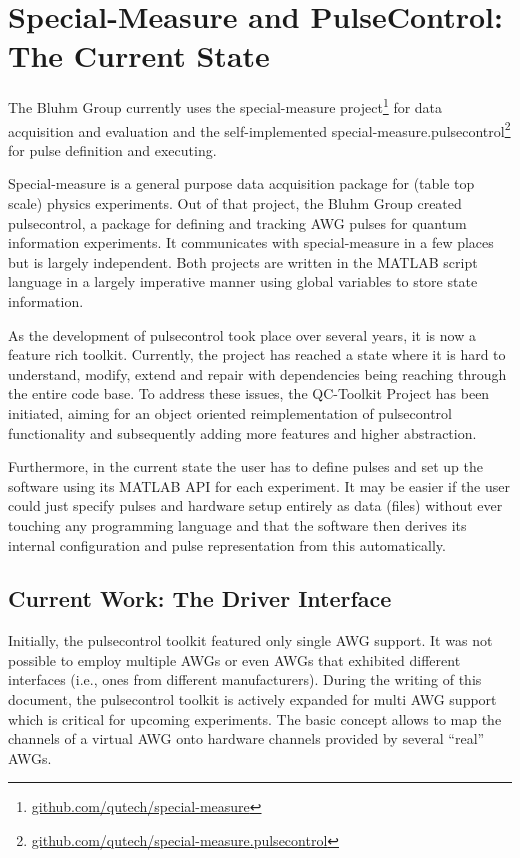 \documentclass[a4paper,12pt]{article}
\begin{document}
\section{Special-Measure and PulseControl: The Current State}
\label{sec:CurrentState}
The Bluhm Group currently uses the special-measure project\footnote{\href{https://github.com/qutech/special-measure}{github.com/qutech/special-measure}} for data acquisition and evaluation and the self-implemented special-measure.pulsecontrol\footnote{\href{https://github.com/qutech/special-measure.pulsecontrol}{github.com/qutech/special-measure.pulsecontrol}} for pulse definition and executing.

Special-measure is a general purpose data acquisition package for (table top scale) physics experiments. Out of that project, the Bluhm Group created pulsecontrol, a package for defining and tracking AWG pulses for quantum information experiments. It communicates with special-measure in a few places but is largely independent. Both projects are written in the MATLAB script language in a largely imperative manner using global variables to store state information.

As the development of pulsecontrol took place over several years, it is now a feature rich toolkit. Currently, the project has reached a state where it is hard to understand, modify, extend and repair with dependencies being reaching through the entire code base.
To address these issues, the QC-Toolkit Project has been initiated, aiming for an object oriented reimplementation of pulsecontrol functionality and subsequently adding more features and higher abstraction.

Furthermore, in the current state the user has to define pulses and set up the software using its MATLAB API for each experiment. It may be easier if the user could just specify pulses and hardware setup entirely as data (files) without ever touching any programming language and that the software then derives its internal configuration and pulse representation from this automatically.

\subsection{Current Work: The Driver Interface}
Initially, the pulsecontrol toolkit featured only single AWG support. It was not possible to employ multiple AWGs or even AWGs that exhibited different interfaces (i.e., ones from different manufacturers). During the writing of this document, the pulsecontrol toolkit is actively expanded for multi AWG support which is critical for upcoming experiments. The basic concept allows to map the channels of a virtual AWG onto hardware channels provided by several ``real'' AWGs.
\end{document}
